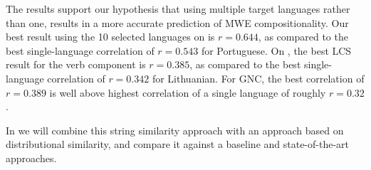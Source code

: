 \documentclass[output=paper
,modfonts
,nonflat]{langsci/langscibook}
\begin{document}

The results support our hypothesis that using multiple target
languages rather than one, results in a more accurate prediction of
MWE compositionality. Our best result using the 10 selected languages
on \REDDY is $r = 0.644$, as compared to the best single-language
correlation of $r = 0.543$ for Portuguese. On \BANNARD, the best LCS result
for the verb component is $r = 0.385$, as compared to the best
single-language correlation of $r = 0.342$ for Lithuanian. For GNC, the best
correlation of $r = 0.389$ is well above highest correlation of a single
language of roughly $r = 0.32$.

In  we will combine this string similarity
approach with an approach based on distributional similarity, and
compare it against a baseline and state-of-the-art approaches.






\end{document}
